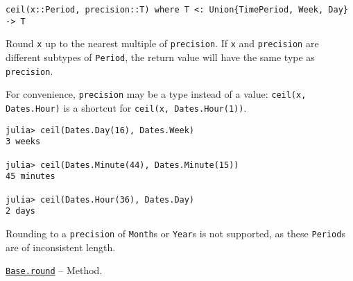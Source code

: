 \begin{adjustwidth}{2em}{0pt}


\begin{verbatim}
ceil(x::Period, precision::T) where T <: Union{TimePeriod, Week, Day} -> T
\end{verbatim}

Round \texttt{x} up to the nearest multiple of \texttt{precision}. If \texttt{x} and \texttt{precision} are different subtypes of \texttt{Period}, the return value will have the same type as \texttt{precision}.

For convenience, \texttt{precision} may be a type instead of a value: \texttt{ceil(x, Dates.Hour)} is a shortcut for \texttt{ceil(x, Dates.Hour(1))}.


\begin{verbatim}
julia> ceil(Dates.Day(16), Dates.Week)
3 weeks

julia> ceil(Dates.Minute(44), Dates.Minute(15))
45 minutes

julia> ceil(Dates.Hour(36), Dates.Day)
2 days
\end{verbatim}

Rounding to a \texttt{precision} of \texttt{Month}s or \texttt{Year}s is not supported, as these \texttt{Period}s are of inconsistent length.



\end{adjustwidth}
\hypertarget{15529975760511008617}{} 
\hyperlink{15529975760511008617}{\texttt{Base.round}}  -- {Method.}


